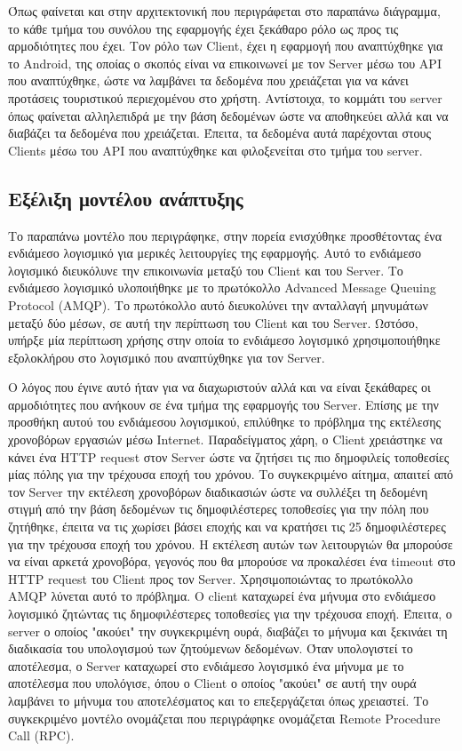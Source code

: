 \documentclass[oneside, 12pt]{book}
\begin{document}
Όπως φαίνεται και στην αρχιτεκτονική που περιγράφεται στο παραπάνω 
διάγραμμα, το κάθε τμήμα του συνόλου της εφαρμογής έχει ξεκάθαρο ρόλο ως προς τις αρμοδιότητες που έχει. Τον ρόλο των Client, έχει η εφαρμογή που αναπτύχθηκε για το Android, της οποίας ο σκοπός είναι να επικοινωνεί με τον Server μέσω του API που αναπτύχθηκε, ώστε να λαμβάνει τα δεδομένα που χρειάζεται για να κάνει προτάσεις τουριστικού περιεχομένου στο χρήστη.
Αντίστοιχα, το κομμάτι του server όπως φαίνεται αλληλεπιδρά με την βάση δεδομένων ώστε να αποθηκεύει αλλά και να διαβάζει τα δεδομένα που χρειάζεται. Έπειτα, τα δεδομένα αυτά παρέχονται στους Clients μέσω του API που αναπτύχθηκε και φιλοξενείται στο τμήμα του server.

\subsection{Εξέλιξη μοντέλου ανάπτυξης}
Το παραπάνω μοντέλο που περιγράφηκε, στην πορεία ενισχύθηκε προσθέτοντας ένα ενδιάμεσο λογισμικό για μερικές λειτουργίες της εφαρμογής. Αυτό το ενδιάμεσο λογισμικό διευκόλυνε την επικοινωνία μεταξύ του Client και του Server. Το ενδιάμεσο λογισμικό υλοποιήθηκε με το πρωτόκολλο Advanced Message Queuing Protocol (AMQP). Το πρωτόκολλο αυτό διευκολύνει την ανταλλαγή μηνυμάτων μεταξύ δύο μέσων, σε αυτή την περίπτωση του Client και του Server. Ωστόσο, υπήρξε μία περίπτωση χρήσης στην οποία το ενδιάμεσο λογισμικό χρησιμοποιήθηκε εξολοκλήρου στο λογισμικό που αναπτύχθηκε για τον Server. 

Ο λόγος που έγινε αυτό ήταν για να διαχωριστούν αλλά και να είναι ξεκάθαρες οι αρμοδιότητες που ανήκουν σε ένα τμήμα της εφαρμογής του Server. Επίσης με την προσθήκη αυτού του ενδιάμεσου λογισμικού, επιλύθηκε το πρόβλημα της εκτέλεσης χρονοβόρων εργασιών μέσω Internet. Παραδείγματος χάρη, ο Client χρειάστηκε να κάνει ένα HTTP request στον Server ώστε να ζητήσει τις πιο δημοφιλείς τοποθεσίες μίας πόλης για την τρέχουσα εποχή του χρόνου. Το συγκεκριμένο αίτημα, απαιτεί από τον Server την εκτέλεση χρονοβόρων διαδικασιών ώστε να συλλέξει τη δεδομένη στιγμή από την βάση δεδομένων τις δημοφιλέστερες τοποθεσίες για την πόλη που ζητήθηκε, έπειτα να τις χωρίσει βάσει εποχής και να κρατήσει τις 25 δημοφιλέστερες για την τρέχουσα εποχή του χρόνου. Η εκτέλεση αυτών των λειτουργιών θα μπορούσε να είναι αρκετά χρονοβόρα, γεγονός που θα μπορούσε να προκαλέσει ένα timeout στο HTTP request του Client προς τον Server. Χρησιμοποιώντας το πρωτόκολλο AMQP λύνεται αυτό το πρόβλημα. Ο client καταχωρεί ένα μήνυμα στο ενδιάμεσο λογισμικό ζητώντας τις δημοφιλέστερες τοποθεσίες για την τρέχουσα εποχή. Έπειτα, ο server ο οποίος "ακούει" την συγκεκριμένη ουρά, διαβάζει το μήνυμα και ξεκινάει τη διαδικασία του υπολογισμού των ζητούμενων δεδομένων. Όταν υπολογιστεί το αποτέλεσμα, ο Server καταχωρεί στο ενδιάμεσο λογισμικό ένα μήνυμα με το αποτέλεσμα που υπολόγισε, όπου ο Client ο οποίος "ακούει" σε αυτή την ουρά λαμβάνει το μήνυμα του αποτελέσματος και το επεξεργάζεται όπως χρειαστεί. Το συγκεκριμένο μοντέλο ονομάζεται που περιγράφηκε ονομάζεται Remote Procedure Call (RPC).
\end{document}

